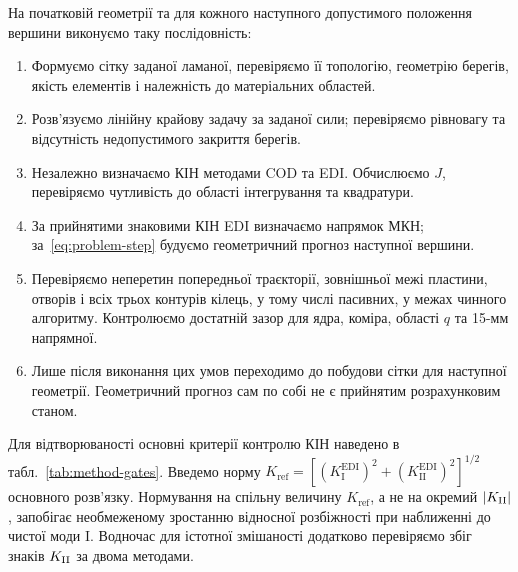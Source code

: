 На початковій геометрії та для кожного наступного допустимого положення вершини виконуємо таку послідовність:
\begin{enumerate}
 \item Формуємо сітку заданої ламаної, перевіряємо її топологію, геометрію берегів, якість елементів і належність до матеріальних областей.
 \item Розв'язуємо лінійну крайову задачу за заданої сили; перевіряємо рівновагу та відсутність недопустимого закриття берегів.
 \item Незалежно визначаємо КІН методами COD та EDI. Обчислюємо $J$, перевіряємо чутливість до області інтегрування та квадратури.
 \item За прийнятими знаковими КІН EDI визначаємо напрямок МКН; за~\eqref{eq:problem-step} будуємо геометричний прогноз наступної вершини.
 \item Перевіряємо неперетин попередньої траєкторії, зовнішньої межі пластини, отворів і всіх трьох контурів кілець, у тому числі пасивних, у межах чинного алгоритму. Контролюємо достатній зазор для ядра, коміра, області $q$ та 15-мм напрямної.
 \item Лише після виконання цих умов переходимо до побудови сітки для наступної геометрії. Геометричний прогноз сам по собі не є прийнятим розрахунковим станом.
\end{enumerate}

Для відтворюваності основні критерії контролю КІН наведено в табл.~\ref{tab:method-gates}. Введемо норму $K_{\mathrm{ref}}=[(K_{\mathrm I}^{\mathrm{EDI}})^2+(K_{\mathrm {II}}^{\mathrm{EDI}})^2]^{1/2}$ основного розв'язку. Нормування на спільну величину $K_{\mathrm{ref}}$, а не на окремий $|K_{\mathrm{II}}|$, запобігає необмеженому зростанню відносної розбіжності при наближенні до чистої моди I. Водночас для істотної змішаності додатково перевіряємо збіг знаків $K_{\mathrm{II}}$ за двома методами.

